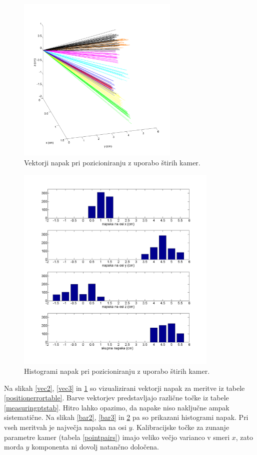 \documentclass[a4paper, 12pt]{book}
\begin{document}
\begin{figure}
\centering
\includegraphics[height=8cm]{points4errplot.png}
\caption{Vektorji napak pri pozicioniranju z uporabo štirih kamer.}
\label{vec4}
\end{figure}
\begin{figure}
\centering
\includegraphics[height=10cm]{points4barplot.png}
\caption{Histogrami napak pri pozicioniranju z uporabo štirih kamer.}
\label{bar4}
\end{figure}


Na slikah \ref{vec2}, \ref{vec3} in \ref{vec4} so vizualizirani vektorji napak za meritve iz tabele \ref{positionerrortable}. Barve vektorjev predstavljajo različne točke iz tabele \ref{measuringptstab}. Hitro lahko opazimo, da napake niso naključne ampak sistematične. Na slikah \ref{bar2}, \ref{bar3} in \ref{bar4} pa so prikazani histogrami napak. Pri vseh meritvah je največja napaka na osi $y$. Kalibracijske točke za zunanje parametre kamer (tabela \ref{pointpairs}) imajo veliko večjo varianco v smeri $x$, zato morda $y$ komponenta ni dovolj natančno določena.
\end{document}
